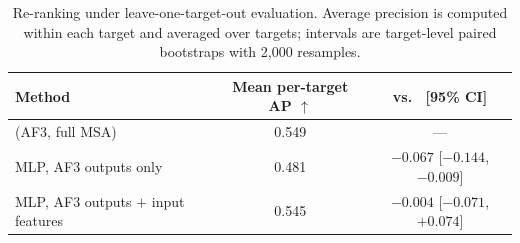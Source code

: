 \begin{table}[t]
  \centering
  \caption{Re-ranking under leave-one-target-out evaluation. Average precision is computed within each target and averaged over targets; intervals are target-level paired bootstraps with 2,000 resamples.}
  \label{tab:mlp}
  \small
  \begin{tabular}{lcc}
    \toprule
    Method & Mean per-target AP $\uparrow$ & \dAP{} vs.\ \ipsaemin{} [95\% CI]\\
    \midrule
    \ipsaemin{} (AF3, full MSA) & 0.549 & ---\\
    MLP, AF3 outputs only & 0.481 & $-0.067$ [$-0.144$, $-0.009$]\\
    MLP, AF3 outputs $+$ input features & 0.545 & $-0.004$ [$-0.071$, $+0.074$]\\
    \bottomrule
  \end{tabular}
\end{table}
